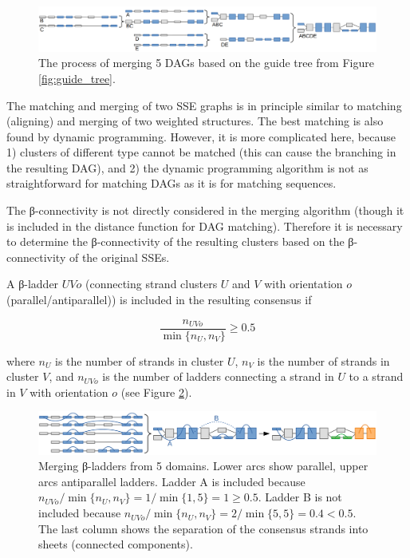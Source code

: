 \documentclass{article}
\begin{document}
\begin{figure}[h!]
  \centering\includegraphics[width=\linewidth]{figures/dag_merging.png}
  \caption{The process of merging 5 DAGs based on the guide tree from Figure \ref{fig:guide_tree}.}
  \label{fig:dag_merging}
\end{figure}

The matching and merging of two SSE graphs is in principle similar to matching (aligning)
and merging of two weighted structures. The best matching is also found
by dynamic programming. However, it is more complicated here, because 1)
clusters of different type cannot be matched (this can cause the
branching in the resulting DAG), and 2) the dynamic programming
algorithm is not as straightforward for matching DAGs as it is for
matching sequences.

The β-connectivity is not directly considered in the merging algorithm 
(though it is included in the distance function for DAG matching).
Therefore it is necessary to determine the β-connectivity of the resulting clusters 
based on the β-connectivity of the original SSEs.

A β-ladder \(UVo\) (connecting strand clusters \(U\) and \(V\) with orientation \(o\) (parallel/antiparallel)) 
is included in the resulting consensus if

\[  \frac { n_{UVo} } { \min{\{n_U, n_V\}} } \geq 0.5  \]

where \(n_U\) is the number of strands in cluster \(U\), 
\(n_V\) is the number of strands in cluster \(V\),
and \(n_{UVo}\) is the number of ladders connecting a strand in \(U\) to a strand in \(V\)
with orientation \(o\) (see Figure \ref{fig:dag_ladders}).

\begin{figure}[h!]
  \centering\includegraphics[width=\linewidth]{figures/dag_ladders.png}
  \caption{Merging β-ladders from 5 domains. 
  Lower arcs show parallel, upper arcs antiparallel ladders.
  Ladder A is included because \( n_{UVo} / \min{\{n_U, n_V\}} = 1 / \min{\{1, 5\}} = 1 \geq 0.5\).
  Ladder B is not included because \( n_{UVo} / \min{\{n_U, n_V\}} = 2 / \min{\{5, 5\}} = 0.4 < 0.5\).
  The last column shows the separation of the consensus strands into sheets (connected components).}
  \label{fig:dag_ladders}
\end{figure}
\end{document}

